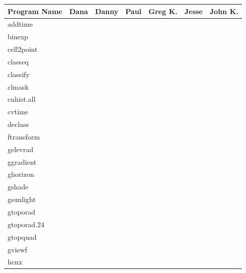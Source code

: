 \vspace{0.5in}

\begin{tabular}{||l|l|l|l|l|l|l||} \hline
Program Name & Dana & Danny & Paul & Greg K. & Jesse & John K. \\ \hline\hline
addtime & & & & & & \\ \hline
binexp & & & & & & \\ \hline
cell2point & & & & & & \\ \hline
classeq & & & & & & \\ \hline
classify & & & & & & \\ \hline
clmask & & & & & & \\ \hline
cnhist.all & & & & & & \\ \hline
cvtime & & & & & & \\ \hline
declass & & & & & & \\ \hline
ftransform & & & & & & \\ \hline
gelevrad & & & & & & \\ \hline
ggradient & & & & & & \\ \hline
ghorizon & & & & & & \\ \hline
gshade & & & & & & \\ \hline
gsunlight & & & & & & \\ \hline
gtoporad & & & & & & \\ \hline
gtoporad.24 & & & & & & \\ \hline
gtopquad & & & & & & \\ \hline
gviewf & & & & & & \\ \hline
hcnx & & & & & & \\ \hline
\end{tabular}
 
